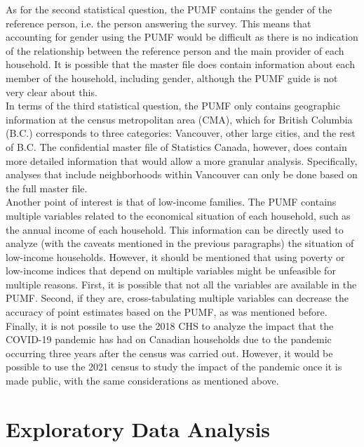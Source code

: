 \documentclass[11pt]{article}
\begin{document}
As for the second statistical question, the PUMF contains the gender
of the reference person, i.e. the person answering the survey.
This means that accounting for gender using the PUMF would be difficult
as there is no indication of the relationship between the reference person
and the main provider of each household. It is possible that the master file
does contain information about each member of the household, including gender,
although the PUMF guide is not very clear about this.
\\

In terms of the third statistical question, the PUMF only
contains geographic information at the census metropolitan area (CMA),
which for British Columbia (B.C.) corresponds to three categories:
Vancouver, other large cities, and the rest of B.C. The confidential
master file of Statistics Canada, however, does contain more detailed
information that would allow a more granular analysis.
Specifically, analyses that include neighborhoods within Vancouver can only
be done based on the full master file.
\\

Another point of interest is that of low-income families. The PUMF contains
multiple variables related to the economical situation of each household,
such as the annual income of each household. This information can be directly
used to analyze (with the caveats mentioned in the previous paragraphs)
the situation of low-income households. However, it should be mentioned that
using poverty or low-income indices that depend on multiple variables might
be unfeasible for multiple reasons. First, it is possible that not all the
variables are available in the PUMF. Second, if they are, cross-tabulating
multiple variables can decrease the accuracy of point estimates based on
the PUMF, as was mentioned before.
\\

Finally, it is not possile to use the 2018 CHS to analyze the impact that
the COVID-19 pandemic has had on Canadian households due to the pandemic
occurring three years after the census was carried out. However, it would
be possible to use the 2021 census to study the impact of the pandemic
once it is made public, with the same considerations as mentioned above.




\section{Exploratory Data Analysis} \label{sec:eda}
\end{document}
